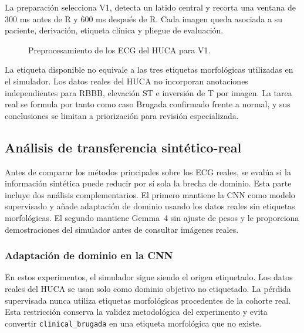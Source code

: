 La preparación selecciona V1, detecta un latido central y recorta una ventana de 300 ms antes de R y 600 ms después de R. Cada imagen queda asociada a su paciente, derivación, etiqueta clínica y pliegue de evaluación.

\begin{figure}[H]
  \centering
  \caption{Preprocesamiento de los ECG del HUCA para V1.}
  \label{fig:huca_preprocesado}
\end{figure}

La etiqueta disponible no equivale a las tres etiquetas morfológicas utilizadas en el simulador. Los datos reales del HUCA no incorporan anotaciones independientes para RBBB, elevación ST e inversión de T por imagen. La tarea real se formula por tanto como caso Brugada confirmado frente a normal, y sus conclusiones se limitan a priorización para revisión especializada.

\subsection{Análisis de transferencia sintético-real}

Antes de comparar los métodos principales sobre los ECG reales, se evalúa si la información sintética puede reducir por sí sola la brecha de dominio. Esta parte incluye dos análisis complementarios. El primero mantiene la CNN como modelo supervisado y añade adaptación de dominio usando los datos reales sin etiquetas morfológicas. El segundo mantiene Gemma~4 sin ajuste de pesos y le proporciona demostraciones del simulador antes de consultar imágenes reales.

\subsubsection{Adaptación de dominio en la CNN}

En estos experimentos, el simulador sigue siendo el origen etiquetado. Los datos reales del HUCA se usan solo como dominio objetivo no etiquetado. La pérdida supervisada nunca utiliza etiquetas morfológicas procedentes de la cohorte real. Esta restricción conserva la validez metodológica del experimento y evita convertir \texttt{clinical\_brugada} en una etiqueta morfológica que no existe.

